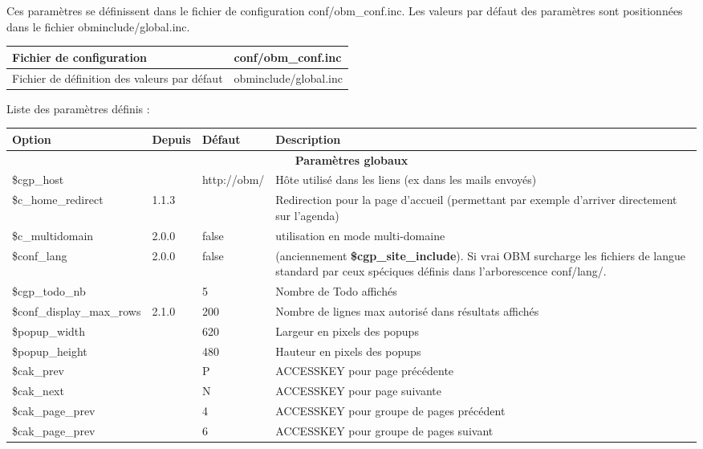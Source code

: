 Ces paramètres se définissent dans le fichier de configuration conf/obm\_conf.inc. Les valeurs par défaut des paramètres sont positionnées dans le fichier obminclude/global.inc.

\begin{tabular}{|p{7cm}|p{5cm}|}
\hline
Fichier de configuration & conf/obm\_conf.inc \\
\hline
Fichier de définition des valeurs par défaut & obminclude/global.inc \\
\hline
\end{tabular}
\vspace{0.3cm}

Liste des paramètres définis :\\


\begin{longtable}{|p{3.7cm}|p{0.8cm}|p{3cm}|p{7cm}|}
\hline
\textbf{Option} & \textbf{Depuis} & \textbf{Défaut} & \textbf{Description} \\
\hline
\hline
\multicolumn{4}{c}{\textbf{Paramètres globaux}}\\
\hline
\hline
\$cgp\_host & & http://obm/ & Hôte utilisé dans les liens (ex dans les mails envoyés) \\ 
\hline
\$c\_home\_redirect & 1.1.3 & & Redirection pour la page d'accueil (permettant par exemple d'arriver directement sur l'agenda) \\ 
\hline
\$c\_multidomain & 2.0.0 & false & utilisation en mode multi-domaine \\ 
\hline
\$conf\_lang & 2.0.0 & false & (anciennement \textbf{\$cgp\_site\_include}). Si vrai OBM surcharge les fichiers de langue standard par ceux spéciques définis dans l'arborescence conf/lang/.\\ 
\hline
\$cgp\_todo\_nb & & 5 & Nombre de Todo affichés \\ 
\hline
\$conf\_display\_max\_rows & 2.1.0 & 200 & Nombre de lignes max autorisé dans résultats affichés \\ 
\hline
\$popup\_width & & 620 & Largeur en pixels des popups \\ 
\hline
\$popup\_height & & 480 & Hauteur en pixels des popups \\ 
\hline
\$cak\_prev & & P & ACCESSKEY pour page précédente \\ 
\hline
\$cak\_next & & N & ACCESSKEY pour page suivante \\ 
\hline
\$cak\_page\_prev & & 4 & ACCESSKEY pour groupe de pages précédent \\ 
\hline
\$cak\_page\_prev & & 6 & ACCESSKEY pour groupe de pages suivant \\ 

\end{longtable}
